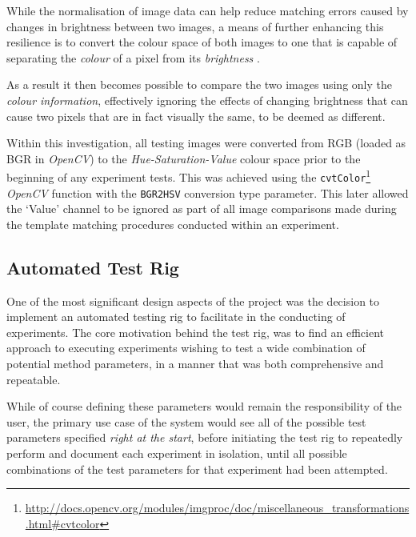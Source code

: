 While the normalisation of image data can help reduce matching errors caused by changes in brightness between two images, a means of further enhancing this resilience is to convert the colour space of both images to one that is capable of separating the \textit{colour} of a pixel from its \textit{brightness} \cite{ulrich-nourbakhsh}. 

As a result it then becomes possible to compare the two images using only the \textit{colour information}, effectively ignoring the effects of changing brightness that can cause two pixels that are in fact visually the same, to be deemed as different.

Within this investigation, all testing images were converted from RGB (loaded as BGR in \textit{OpenCV}) to the \textit{Hue-Saturation-Value} colour space prior to the beginning of any experiment tests. This was achieved using the \texttt{cvtColor}\footnote{\url{http://docs.opencv.org/modules/imgproc/doc/miscellaneous_transformations.html#cvtcolor}} \textit{OpenCV} function with the \texttt{BGR2HSV} conversion type parameter. This later allowed the `Value' channel to be ignored as part of all image comparisons made during the template matching procedures conducted within an experiment.


\subsection{Automated Test Rig}

One of the most significant design aspects of the project was the decision to implement an automated testing rig to facilitate in the conducting of experiments. The core motivation behind the test rig, was to find an efficient approach to executing experiments wishing to test a wide combination of potential method parameters, in a manner that was both comprehensive and repeatable. 

While of course defining these parameters would remain the responsibility of the user, the primary use case of the system would see all of the possible test parameters specified \textit{right at the start}, before initiating the test rig to repeatedly perform and document each experiment in isolation, until all possible combinations of the test parameters for that experiment had been attempted. 

